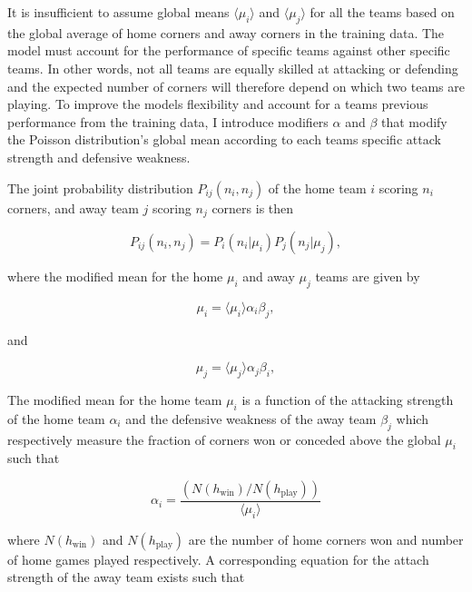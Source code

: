 \documentclass[10pt]{article}
\begin{document}
It is insufficient to assume global means $\langle \mu_i \rangle$ and $\langle \mu_j \rangle$ for all the teams based on the global average of home corners and away corners in the training data. The model must account for the performance of specific teams against other specific teams. In other words, not all teams are equally skilled at attacking or defending and the expected number of corners will therefore depend on which two teams are playing. To improve the models flexibility and account for a teams previous performance from the training data, I introduce modifiers $\alpha$ and $\beta$ that modify the Poisson distribution's global mean according to each teams specific attack strength and defensive weakness.

The joint probability distribution $P_{ij}(n_i,n_j)$ of the home team $i$ scoring $n_i$ corners, and away team $j$ scoring $n_j$ corners is then

\begin{equation}
\label{eq_modpoison}
P_{ij}(n_i,n_j) = P_i(n_i|\mu_i) P_j(n_j|\mu_j),
\end{equation}

\noindent where the modified mean for the home $\mu_i$ and away $\mu_j$ teams are given by 

\begin{equation}
\mu_i = \langle \mu_i \rangle \alpha_i \beta_j,
\end{equation}

\noindent and

\begin{equation}
\mu_j = \langle \mu_j \rangle \alpha_j \beta_i,
\end{equation}

\noindent The modified mean for the home team $\mu_i$ is a function of the attacking strength of the home team $\alpha_i$ and the defensive weakness of the away team $\beta_j$ which respectively measure the fraction of corners won or conceded above the global $\mu_i$ such that

\begin{equation}
\label{eq_attack_home}
\alpha_i = \frac{\left( N(h_\mathrm{win}) / N(h_\mathrm{play} )\right) }{\langle \mu_i \rangle } 
\end{equation}

\noindent where $N(h_\mathrm{win})$ and $N(h_\mathrm{play})$ are the number of home corners won and number of home games played respectively. A corresponding equation for the attach strength of the away team exists such that
\end{document}
